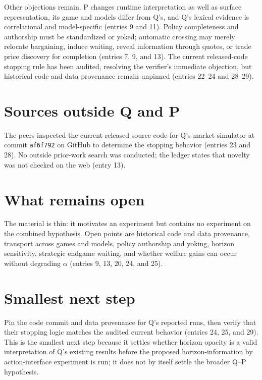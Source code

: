 \documentclass{article}
\begin{document}
Other objections remain. P changes runtime interpretation as well as surface representation, its game and models differ from Q's, and Q's lexical evidence is correlational and model-specific (entries 9 and 11). Policy completeness and authorship must be standardized or yoked; automatic crossing may merely relocate bargaining, induce waiting, reveal information through quotes, or trade price discovery for completion (entries 7, 9, and 13). The current released-code stopping rule has been audited, resolving the verifier's immediate objection, but historical code and data provenance remain unpinned (entries 22--24 and 28--29).

\section*{Sources outside Q and P}
The peers inspected the current released source code for Q's market simulator at commit \texttt{af6f792} on GitHub to determine the stopping behavior (entries 23 and 28). No outside prior-work search was conducted; the ledger states that novelty was not checked on the web (entry 13).

\section*{What remains open}
The material is thin: it motivates an experiment but contains no experiment on the combined hypothesis. Open points are historical code and data provenance, transport across games and models, policy authorship and yoking, horizon sensitivity, strategic endgame waiting, and whether welfare gains can occur without degrading $\alpha$ (entries 9, 13, 20, 24, and 25).

\section*{Smallest next step}
Pin the code commit and data provenance for Q's reported runs, then verify that their stopping logic matches the audited current behavior (entries 24, 25, and 29). This is the smallest next step because it settles whether horizon opacity is a valid interpretation of Q's existing results before the proposed horizon-information by action-interface experiment is run; it does not by itself settle the broader Q--P hypothesis.
\end{document}
